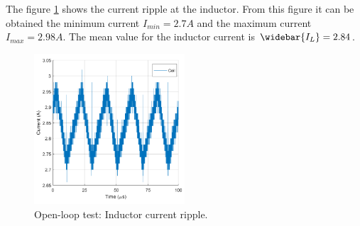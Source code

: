 The figure \ref{Openlooptestinductor} shows the current ripple at the inductor. From this figure it can be obtained  the minimum current $I_{min} = 2.7A$ and the maximum current $I_{max} = 2.98A$. The mean value for the inductor current is $\widebar{I_L}= 2.84$.

\begin{figure}[H]
	\begin{center}
		\includegraphics[width=0.5\textwidth]{../Pictures/P1/Test/Openloopinductor}
		\caption{Open-loop test: Inductor current ripple.}
		\label{Openlooptestinductor}
	\end{center}	
\end{figure}